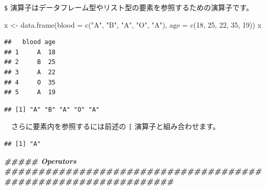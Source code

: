 \documentclass[
  12pt,
]{book}
\newenvironment{Shaded}{\begin{snugshade}}{\end{snugshade}}
\newcommand{\AttributeTok}[1]{\textcolor[rgb]{0.77,0.63,0.00}{#1}}
\newcommand{\DecValTok}[1]{\textcolor[rgb]{0.00,0.00,0.81}{#1}}
\newcommand{\DocumentationTok}[1]{\textcolor[rgb]{0.56,0.35,0.01}{\textbf{\textit{#1}}}}
\newcommand{\FunctionTok}[1]{\textcolor[rgb]{0.00,0.00,0.00}{#1}}
\newcommand{\NormalTok}[1]{#1}
\newcommand{\OtherTok}[1]{\textcolor[rgb]{0.56,0.35,0.01}{#1}}
\newcommand{\SpecialCharTok}[1]{\textcolor[rgb]{0.00,0.00,0.00}{#1}}
\newcommand{\StringTok}[1]{\textcolor[rgb]{0.31,0.60,0.02}{#1}}
\begin{document}
\texttt{\$} 演算子はデータフレーム型やリスト型の要素を参照するための演算子です。

\begin{Shaded}
\begin{Highlighting}[]
\NormalTok{x }\OtherTok{\textless{}{-}} \FunctionTok{data.frame}\NormalTok{(}\AttributeTok{blood =} \FunctionTok{c}\NormalTok{(}\StringTok{"A"}\NormalTok{, }\StringTok{"B"}\NormalTok{, }\StringTok{"A"}\NormalTok{, }\StringTok{"O"}\NormalTok{, }\StringTok{"A"}\NormalTok{), }\AttributeTok{age =} \FunctionTok{c}\NormalTok{(}\DecValTok{18}\NormalTok{, }\DecValTok{25}\NormalTok{, }\DecValTok{22}\NormalTok{, }\DecValTok{35}\NormalTok{, }\DecValTok{19}\NormalTok{))}
\NormalTok{x}
\end{Highlighting}
\end{Shaded}

\begin{verbatim}
##   blood age
## 1     A  18
## 2     B  25
## 3     A  22
## 4     O  35
## 5     A  19
\end{verbatim}

\begin{Shaded}
\end{Shaded}

\begin{verbatim}
## [1] "A" "B" "A" "O" "A"
\end{verbatim}

　さらに要素内を参照するには前述の \texttt{{[}} 演算子と組み合わせます。

\begin{Shaded}
\end{Shaded}

\begin{verbatim}
## [1] "A"
\end{verbatim}

\begin{Shaded}
\begin{Highlighting}[]
\DocumentationTok{\#\#\#\#\# Operators \#\#\#\#\#\#\#\#\#\#\#\#\#\#\#\#\#\#\#\#\#\#\#\#\#\#\#\#\#\#\#\#\#\#\#\#\#\#\#\#\#\#\#\#\#\#\#\#\#\#\#\#\#\#\#\#\#\#\#\#\#\#\#}
\end{Highlighting}
\end{Shaded}
\end{document}
